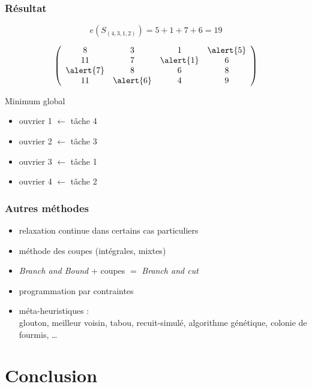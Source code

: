 \documentclass{beamer}
\begin{document}
\begin{frame}
  \frametitle{Résultat}


  \[
  e(S_{(4,3,1,2)}) = 5 + 1 + 7 + 6 = 19
  \]
  
  \[
  \left(
  \begin{array}{cccc}
    8 & 3 & 1 & \alert{5} \\
    11 & 7 & \alert{1} & 6 \\
    \alert{7} & 8 & 6 & 8 \\
    11 & \alert{6} & 4 & 9 
  \end{array}
  \right)
  \]

  \begin{block}{Minimum global}
  \begin{itemize}
    \item ouvrier 1 $\leftarrow$ tâche 4
    \item ouvrier 2 $\leftarrow$ tâche 3
    \item ouvrier 3 $\leftarrow$ tâche 1
    \item ouvrier 4 $\leftarrow$ tâche 2
  \end{itemize}
  \end{block}
\end{frame}

\begin{frame}
  \frametitle{Autres méthodes}

  \begin{itemize}
  \item relaxation continue dans certains cas particuliers
  \item méthode des coupes (intégrales, mixtes)
  \item \emph{Branch and Bound} + coupes $=$ \emph{Branch and cut}
  \item programmation par contraintes
  \item méta-heuristiques : \\
      glouton, meilleur voisin, tabou, recuit-simulé, algorithme génétique, colonie de fourmis, \dots
  \end{itemize}
  
\end{frame}


\section{Conclusion}
\end{document}
